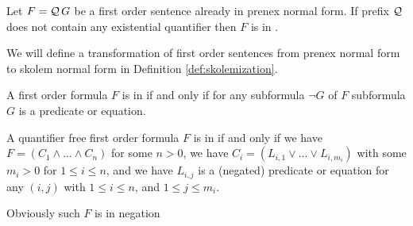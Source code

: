 \begin{definition}\label{def:skolem:normal:form}
	Let \( F = \mathcal{Q}\,G \) be a first order sentence already
	in prenex normal form.
	If prefix \( \mathcal{Q} \) does not contain any existential quantifier
	then \( F \) is in .
\end{definition}

We will define a transformation of first order sentences 
from prenex normal form
to skolem normal form 
in Definition \vref{def:skolemization}.

\begin{definition}\label{def:negation:normal:form}
	A first order formula \( F \)
	is in 
	if and only if for any subformula \( \lnot G \) of \( F \)
	subformula \( G \)
	is a predicate or equation.
\end{definition}

\begin{definition}\label{def:conjunctive:normal:form}
	A quantifier free first order formula \( F \)
	is in 
	if and only if 
	we have
	\( F = (C_1 \land ... \land C_n) \) for some \( n > 0 \),
	we have 
	\( C_i = (L_{i,1} \lor ... \lor L_{i, m_i}) \) with some \( m_i > 0 \)
	for \( 1 \leq i \leq n \), 
	and we have
	\( L_{i,j} \) 
	is a (negated) predicate or equation
	for any \((i,j)\) with
	\( 1 \leq i \leq n \), and
	\( 1 \leq j \leq m_i \).

	Obviously such \( F \) is in negation 
\end{definition}



